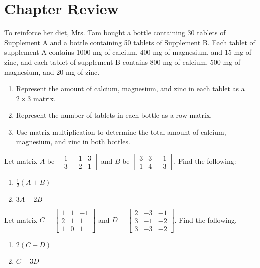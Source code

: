 \section{Chapter Review}

\begin{puzzle}
    To reinforce her diet, Mrs. Tam bought a bottle containing 30 tablets of Supplement A and a bottle containing 50 tablets of Supplement B. Each tablet of supplement A contains 1000 mg of calcium, 400 mg of magnesium, and 15 mg of zinc, and each tablet of supplement B contains 800 mg of calcium, 500 mg of magnesium, and 20 mg of zinc.
    \begin{enumerate}
        \item Represent the amount of calcium, magnesium, and zinc in each tablet as a \(2 \times 3\) matrix.
        \item Represent the number of tablets in each bottle as a row matrix.
        \item Use matrix multiplication to determine the total amount of calcium, magnesium, and zinc in both bottles.
    \end{enumerate}
\end{puzzle}

\begin{puzzle}
    Let matrix \( A \) be
    $\begin{bmatrix}
            1 & -1 & 3 \\
            3 & -2 & 1
        \end{bmatrix}$
    and \( B \) be
    $\begin{bmatrix}
            3 & 3 & -1 \\
            1 & 4 & -3
        \end{bmatrix}$.
    Find the following:
    \begin{enumerate}
        \item \(\frac{1}{2}(A + B)\)
        \item \(3A - 2B\)
    \end{enumerate}
\end{puzzle}

\begin{puzzle}
    Let matrix \(C = \begin{bmatrix}
        1 & 1 & -1 \\
        2 & 1 & 1  \\
        1 & 0 & 1
    \end{bmatrix}\)
    and \(D = \begin{bmatrix}
        2 & -3 & -1 \\
        3 & -1 & -2 \\
        3 & -3 & -2
    \end{bmatrix}\). Find the following.
    \begin{enumerate}
        \item \(2(C - D)\)
        \item \(C - 3D\)
    \end{enumerate}
\end{puzzle}

